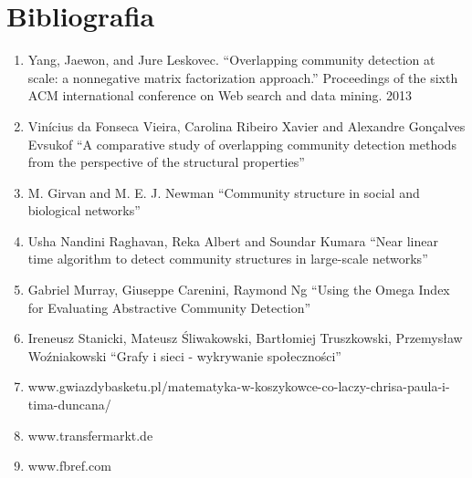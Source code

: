 \documentclass{article}
\begin{document}
\section{Bibliografia}
\begin{enumerate}

\item Yang, Jaewon, and Jure Leskovec. ``Overlapping community detection at scale: a nonnegative matrix factorization approach.'' Proceedings of the sixth ACM international conference on Web search and data mining. 2013

\item Vinícius da Fonseca Vieira, Carolina Ribeiro Xavier and Alexandre Gonçalves Evsukof ``A comparative study of overlapping community detection methods from the perspective of the structural properties''

\item M. Girvan and M. E. J. Newman ``Community structure in social and biological networks''

\item Usha Nandini Raghavan, Reka Albert and Soundar Kumara ``Near linear time algorithm to detect community structures in large-scale networks''

\item Gabriel Murray, Giuseppe Carenini, Raymond Ng ``Using the Omega Index for Evaluating Abstractive Community Detection''

\item Ireneusz Stanicki, Mateusz Śliwakowski, Bartłomiej Truszkowski, Przemysław Woźniakowski ``Grafy i sieci - wykrywanie społeczności''

\item www.gwiazdybasketu.pl/matematyka-w-koszykowce-co-laczy-chrisa-paula-i-tima-duncana/

\item www.transfermarkt.de

\item www.fbref.com

\end{enumerate}
\end{document}

